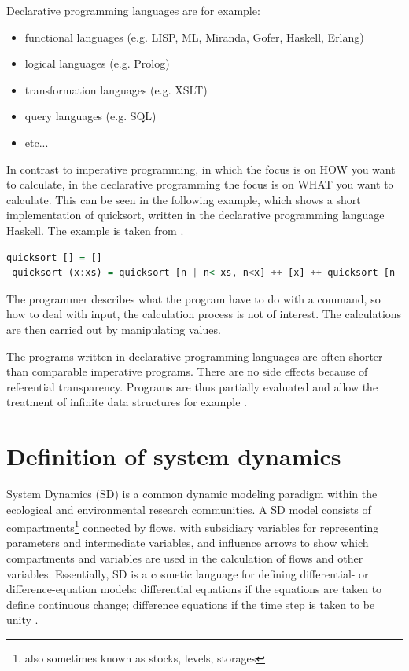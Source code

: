\par
Declarative programming languages are for example:
\begin{itemize}
	\item functional languages (e.g. LISP, ML, Miranda, Gofer, Haskell, Erlang)
	\item logical languages (e.g. Prolog)
	\item transformation languages (e.g. XSLT)
	\item query languages (e.g. SQL)
	\item etc...
\end{itemize}

\par
In contrast to imperative programming, in which the focus is on HOW you want to calculate, in the declarative programming the focus is on WHAT you want to calculate. This can be seen in the following example, which shows a short implementation of quicksort, written in the declarative programming language Haskell. The example is taken from \autocite{appendix:declarative_programming}.
\begin{lstlisting}[language=Haskell]
 quicksort [] = []
 quicksort (x:xs) = quicksort [n | n<-xs, n<x] ++ [x] ++ quicksort [n | n<-xs, n>=x]
\end{lstlisting}
The programmer describes what the program have to do with a command, so how to deal with input, the calculation process is not of interest. The calculations are then carried out by manipulating values.
\par
The programs written in declarative programming languages are often shorter than comparable imperative programs. There are no side effects because of referential transparency. Programs are thus partially evaluated and allow the treatment of infinite data structures for example \autocite{appendix:hawkins}.

\section{Definition of system dynamics}
\par
System Dynamics (SD) is a common dynamic modeling paradigm within the ecological and environmental research communities. A SD model consists of compartments\footnote{also sometimes known as stocks, levels, storages}  connected by flows, with subsidiary variables for representing parameters and intermediate variables, and influence arrows to show which compartments and variables are used in the calculation of flows and other variables. Essentially, SD is a cosmetic language for defining differential- or difference-equation models: differential equations if the equations are taken to define continuous change; difference equations if the time step is taken to be unity \autocite{appendix:model_paradigm}.

